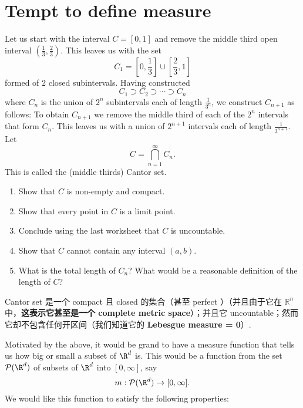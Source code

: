 \documentclass[lang=cn,11pt]{template}
\begin{document}
\chapter{Tempt to define measure}

 Let us start with the interval $C=[0,1]$ and remove the middle third open interval $(\frac 13, \frac23)$. This leaves us with the set 
$$C_1=\left[0, \frac13\right]\cup \left[\frac23, 1\right]$$ formed of $2$ closed subintervals. Having constructed $$C_1\supset C_2\supset \cdots \supset C_n$$ where $C_n$ is the union of $2^n$ subintervals each of length $\frac{1}{3^n}$, we construct $C_{n+1}$ as follows: To obtain $C_{n+1}$ we remove the middle third of each of the $2^n$ intervals that form $C_n$. This leaves us with a union of $2^{n+1}$ intervals each of length $\frac{1}{3^{n+1}}$. Let $$C=\bigcap_{n=1}^{\infty} C_n.$$ This is called the (middle thirds) Cantor set. 

\begin{enumerate}

\item Show that $C$ is non-empty and compact.

\item Show that every point in $C$ is a limit point.  

\item Conclude using the last worksheet that $C$ is uncountable.

\item  Show that $C$ cannot contain any interval $(a, b)$. 

\item What is the total length of $C_n$? What would be a reasonable definition of the length of $C$?

\end{enumerate}

\begin{remark}
     Cantor set 是一个 compact 且 closed 的集合（甚至 perfect ）（并且由于它在  $\mathbb{R}^n$ 中，\textbf{这表示它甚至是一个 complete metric space}）；并且它 uncountable；然而它却不包含任何开区间（我们知道它的 \textbf{Lebesgue measure = 0}）.
    
\end{remark}

 Motivated by the above, it would be grand to have a measure function that tells us how big or small a subset of $\R^d$ is. This would be a function from the set $\mathcal P(\R^d)$ of subsets of $\R^d$ into $[0, \infty]$, say $$m: \mathcal P(\R^d)\to [0,\infty].$$ We would like this function to satisfy the following properties: 
\end{document}
